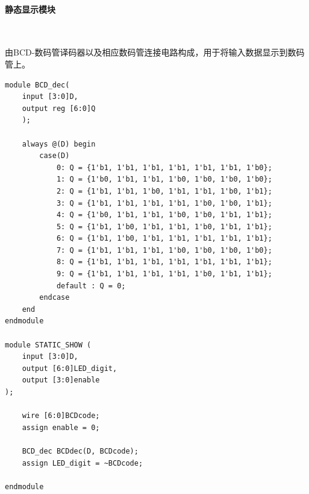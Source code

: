 \documentclass[UTF8]{ctexart}
\numberwithin{figure}{subsection}
\numberwithin{table}{subsection}
\numberwithin{equation}{subsection}
\begin{document}
\paragraph{静态显示模块}~
\par 由BCD-数码管译码器以及相应数码管连接电路构成，用于将输入数据显示到数码管上。
\begin{lstlisting}[style={verilog-style}]
module BCD_dec(
    input [3:0]D,
    output reg [6:0]Q
    );

    always @(D) begin
        case(D)
            0: Q = {1'b1, 1'b1, 1'b1, 1'b1, 1'b1, 1'b1, 1'b0};
            1: Q = {1'b0, 1'b1, 1'b1, 1'b0, 1'b0, 1'b0, 1'b0};
            2: Q = {1'b1, 1'b1, 1'b0, 1'b1, 1'b1, 1'b0, 1'b1};
            3: Q = {1'b1, 1'b1, 1'b1, 1'b1, 1'b0, 1'b0, 1'b1};
            4: Q = {1'b0, 1'b1, 1'b1, 1'b0, 1'b0, 1'b1, 1'b1};
            5: Q = {1'b1, 1'b0, 1'b1, 1'b1, 1'b0, 1'b1, 1'b1};
            6: Q = {1'b1, 1'b0, 1'b1, 1'b1, 1'b1, 1'b1, 1'b1};
            7: Q = {1'b1, 1'b1, 1'b1, 1'b0, 1'b0, 1'b0, 1'b0};
            8: Q = {1'b1, 1'b1, 1'b1, 1'b1, 1'b1, 1'b1, 1'b1};
            9: Q = {1'b1, 1'b1, 1'b1, 1'b1, 1'b0, 1'b1, 1'b1};
            default : Q = 0;
        endcase
    end
endmodule

module STATIC_SHOW (
    input [3:0]D,
    output [6:0]LED_digit,
    output [3:0]enable
);

    wire [6:0]BCDcode;
    assign enable = 0;
    
    BCD_dec BCDdec(D, BCDcode);
    assign LED_digit = ~BCDcode;

endmodule
\end{lstlisting}
\end{document}
